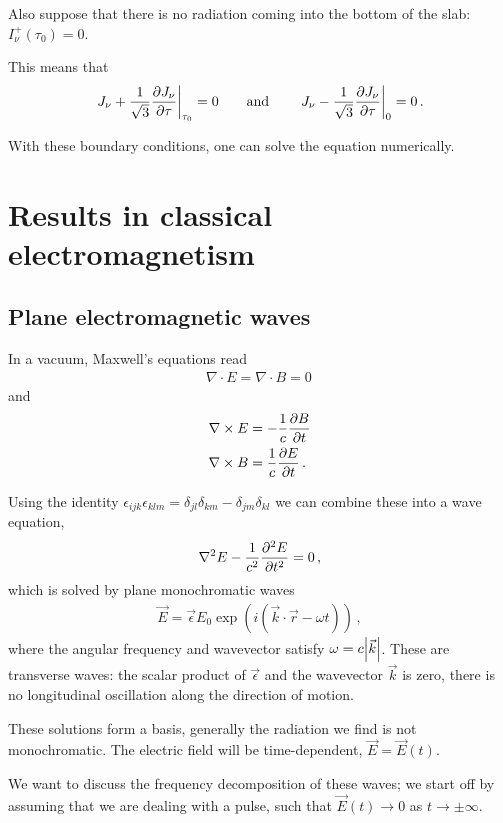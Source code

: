 \documentclass[main.tex]{subfiles}
\begin{document}
Also suppose that there is no radiation coming into the bottom of the slab: \(I_\nu^{+} (\tau_0 ) = 0\). 

This means that 
%
\begin{align}
\eval{J_\nu + \frac{1}{\sqrt{3}} \pdv{J_\nu }{\tau }}_{\tau_0 } = 0
\qquad \text{and} \qquad
\eval{J_\nu - \frac{1}{\sqrt{3}} \pdv{J_\nu }{\tau }}_{0} = 0
\,. 
\end{align}

With these boundary conditions, one can solve the equation numerically.

\chapter{Results in classical electromagnetism}

\section{Plane electromagnetic waves}

In a vacuum, Maxwell's equations read 
%
\begin{align}
\nabla \cdot E = \nabla \cdot B =0
\,
\end{align}
%
and 
%
\begin{align}
\nabla \times E &= - \frac{1}{c} \pdv{B}{t}  \\
\nabla \times B &= \frac{1}{c} \pdv{E}{t}
\,.
\end{align}

Using the identity \(\epsilon_{ijk} \epsilon_{klm} = \delta_{jl} \delta_{km} - \delta_{jm} \delta_{kl}\) we can combine these into a wave equation, 
%
\begin{align}
\nabla^2 E - \frac{1}{c^2} \pdv[2]{E}{t} = 0 
\,,
\end{align}
%
which is solved by plane monochromatic waves 
%
\begin{align}
\vec{E}  =\vec{\epsilon} E_0 \exp(i (\vec{k} \cdot \vec{r} - \omega t))
\,,
\end{align}
%
where the angular frequency and wavevector satisfy \(\omega = c \abs{\vec{k}}\).
These are transverse waves: the scalar product of \(\vec{\epsilon}\) and the wavevector \(\vec{k}\) is zero, there is no longitudinal oscillation along the direction of motion. 

These solutions form a basis, generally the radiation we find is not monochromatic. 
The electric field will be time-dependent, \(\vec{E} = \vec{E} (t)\). 

We want to discuss the frequency decomposition of these waves; we start off by assuming that we are dealing with a pulse, such that \(\vec{E}(t) \rightarrow 0\) as \(t \to \pm \infty \).
\end{document}
